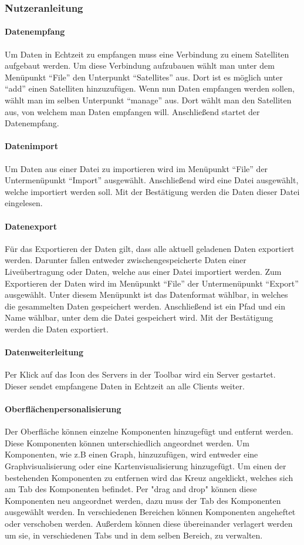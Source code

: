 \subsubsection{Nutzeranleitung}
\paragraph{Datenempfang}
Um Daten in Echtzeit zu empfangen muss eine Verbindung zu einem Satelliten aufgebaut werden. Um diese Verbindung aufzubauen wählt man unter dem Menüpunkt ``File'' den Unterpunkt ``Satellites'' aus. Dort ist es möglich unter ``add'' einen Satelliten hinzuzufügen. Wenn nun Daten empfangen werden sollen, wählt man im selben Unterpunkt ``manage'' aus. Dort wählt man den Satelliten aus, von welchem man Daten empfangen will. Anschließend startet der Datenempfang.
\paragraph{Datenimport}
Um Daten aus einer Datei zu importieren wird im Menüpunkt ``File'' der Untermenüpunkt ``Import'' ausgewählt. Anschließend wird eine Datei ausgewählt, welche importiert werden soll. Mit der Bestätigung werden die Daten dieser Datei eingelesen.
\paragraph{Datenexport}
Für das Exportieren der Daten gilt, dass alle aktuell geladenen Daten exportiert werden. Darunter fallen entweder zwischengespeicherte Daten einer Liveübertragung oder Daten, welche aus einer Datei importiert werden.
Zum Exportieren der Daten wird im Menüpunkt ``File'' der Untermenüpunkt ``Export'' ausgewählt. Unter diesem Menüpunkt ist das Datenformat wählbar, in welches die gesammelten Daten gespeichert werden. Anschließend ist ein Pfad und ein Name wählbar, unter dem die Datei gespeichert wird. Mit der Bestätigung werden die Daten exportiert.
\paragraph{Datenweiterleitung}
Per Klick auf das Icon des Servers in der Toolbar wird ein Server gestartet. Dieser sendet empfangene Daten in Echtzeit an alle Clients weiter.
\paragraph{Oberflächenpersonalisierung}
Der Oberfläche können einzelne Komponenten hinzugefügt und entfernt werden. Diese Komponenten können unterschiedlich angeordnet werden. Um Komponenten, wie z.B einen Graph, hinzuzufügen, wird entweder eine Graphvisualisierung oder eine Kartenvisualisierung hinzugefügt. Um einen der bestehenden Komponenten zu entfernen wird das Kreuz angeklickt, welches sich am Tab des Komponenten befindet. Per "drag and drop"  können diese Komponenten neu angeordnet werden, dazu muss der Tab des Komponenten ausgewählt werden. In verschiedenen Bereichen können Komponenten angeheftet oder verschoben werden. Außerdem können diese übereinander verlagert werden um sie, in verschiedenen Tabs und in dem selben Bereich, zu verwalten.

